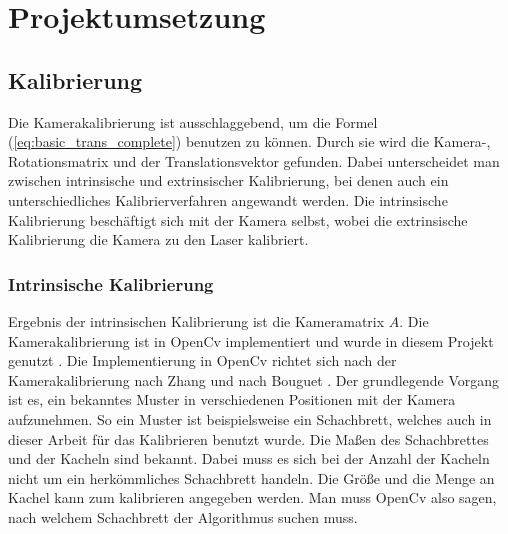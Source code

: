 \section{Projektumsetzung}\label{ergebnisse}
	\subsection{Kalibrierung}
		Die Kamerakalibrierung ist ausschlaggebend, um die Formel (\ref{eq:basic_trans_complete}) benutzen zu können. Durch sie wird die Kamera-, Rotationsmatrix und der Translationsvektor gefunden. Dabei unterscheidet man zwischen intrinsische und extrinsischer Kalibrierung, bei denen auch ein unterschiedliches Kalibrierverfahren angewandt werden. Die intrinsische Kalibrierung beschäftigt sich mit der Kamera selbst, wobei die extrinsische Kalibrierung die Kamera zu den Laser kalibriert.
		
		\label{chap:kalibierung}
		\subsubsection{Intrinsische Kalibrierung}
		Ergebnis der intrinsischen Kalibrierung ist die Kameramatrix \( A \). Die Kamerakalibrierung ist in OpenCv implementiert und wurde in diesem Projekt genutzt \citep[Vgl.][]{noauthor_opencv_nodate-1}. Die Implementierung in OpenCv richtet sich nach der Kamerakalibrierung nach Zhang \citep{zhang_flexible_2000} und nach Bouguet \citep{noauthor_camera_nodate}. \newline
		Der grundlegende Vorgang ist es, ein bekanntes Muster in verschiedenen Positionen mit der Kamera aufzunehmen. So ein Muster ist beispielsweise ein Schachbrett, welches auch in dieser Arbeit für das Kalibrieren benutzt wurde. Die Maßen des Schachbrettes und der Kacheln sind bekannt. Dabei muss es sich bei der Anzahl der Kacheln nicht um ein herkömmliches Schachbrett handeln. Die Größe und die Menge an Kachel kann zum kalibrieren angegeben werden. Man muss OpenCv also sagen, nach welchem Schachbrett der Algorithmus suchen muss.
		
